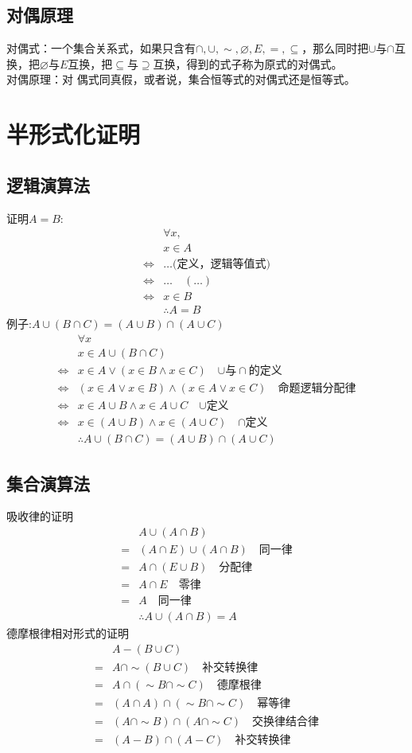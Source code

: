 \documentclass{book}
\newcommand{\Eqv}{\Leftrightarrow}
\newcommand{\A}{\forall}
\newcommand{\no}{\varnothing}
\begin{document}
\subsection{对偶原理}
\noindent
对偶式：一个集合关系式，如果只含有$\cap,\cup,\sim,\no,E,=,\subseteq$，那么同时把$\cup$与$\cap$互换，把$\no$与$E$互换，把$\subseteq$与$\supseteq$互换，得到的式子称为原式的对偶式。\\
对偶原理：对 偶式同真假，或者说，集合恒等式的对偶式还是恒等式。
\section{半形式化证明} 
\subsection{逻辑演算法} 
证明$A=B$:
\begin{align*}
    &\A x,\\
    &x\in A\\
    \Eqv&\dots \mbox{(定义，逻辑等值式)}\\
    \Eqv&\dots\quad (\dots)\\
    \Eqv&x\in B\\
    &\therefore A=B
\end{align*}  
例子:$A\cup (B\cap C)=(A\cup B)\cap (A\cup C)$
\begin{align*} 
&\A x\\
&x\in A\cup (B\cap C)\\
\Eqv&x\in A\lor (x\in B\land x\in C)\quad\mbox{$\cup$与$\cap$的定义}\\
\Eqv&(x\in A\lor x\in B)\land (x\in A\lor x\in C)\quad\mbox{命题逻辑分配律}\\
\Eqv&x\in A\cup B\land x\in A\cup C\quad\mbox{$\cup$定义}\\
\Eqv&x\in (A\cup B)\land x\in (A\cup C)\quad\mbox{$\cap$定义}\\
&\therefore A\cup (B\cap C)=(A\cup B)\cap (A\cup C)
\end{align*}
\subsection{集合演算法}
\noindent
吸收律的证明
\begin{align*}
&A\cup (A\cap B)\\
=&(A\cap E)\cup (A\cap B)\quad\mbox{同一律}\\
=&A\cap (E\cup B)\quad\mbox{分配律}\\
=&A\cap E\quad\mbox{零律}\\
=&A\quad\mbox{同一律}\\
&\therefore A\cup (A\cap B)=A
\end{align*}
德摩根律相对形式的证明
\begin{align*}
&A-(B\cup C)\\
=&A\cap\sim (B\cup C)\quad\mbox{补交转换律}\\
=&A\cap(\sim B\cap\sim C)\quad\mbox{德摩根律}\\
=&(A\cap A)\cap (\sim B\cap\sim C)\quad\mbox{幂等律}\\
=&(A\cap\sim B)\cap (A\cap\sim C)\quad\mbox{交换律结合律}\\
=&(A-B)\cap (A-C)\quad\mbox{补交转换律}
\end{align*}
\end{document}
